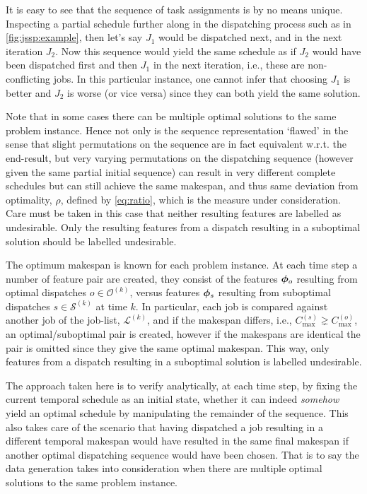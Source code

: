 \documentclass[smallextended]{svjour3}
\begin{document}
It is easy to see that the sequence of task assignments is by no means unique. 
Inspecting a partial schedule further along in the dispatching process such as 
in \cref{fig:jssp:example}, then let's say $J_1$ would be dispatched next, and 
in the next iteration $J_2$. Now this sequence would yield the same schedule as 
if $J_2$ would have been dispatched first and then $J_1$ in the next iteration, 
i.e., these are non-conflicting jobs.  In this particular instance, one cannot 
infer that choosing $J_1$ is better and $J_2$ is worse (or vice versa) since
they can both yield the same solution. 

Note that in some cases there can be multiple optimal solutions to the same 
problem instance. Hence not only is the sequence representation `flawed' in the 
sense that slight permutations on the sequence are in fact equivalent w.r.t. 
the end-result, but very varying permutations on the dispatching sequence 
(however given the same partial initial sequence) can result in very different 
complete schedules but can still achieve the same makespan, and thus same 
deviation from optimality, $\rho$, defined by \cref{eq:ratio}, which is the 
measure under consideration. Care must be taken in this case that neither 
resulting features are labelled as undesirable. Only the resulting features 
from a dispatch resulting in a suboptimal solution should be labelled 
undesirable.

The optimum makespan is known for each problem instance. At each time step a 
number of feature pair are created, they consist of the features $\bm{\phi}_o$ 
resulting from optimal dispatches $o\in\mathcal{O}^{(k)}$, versus features 
$\bm{\phi}_s$ resulting from suboptimal dispatches $s\in\mathcal{S}^{(k)}$ at time 
$k$. %
In particular, each job is compared against another job of the job-list, 
$\mathcal{L}^{(k)}$, and if the makespan differs, i.e., $C_{\max}^{(s)}\gneq 
C_{\max}^{(o)}$, an optimal/suboptimal pair is created, however if the 
makespans are identical the pair is omitted since they give the same optimal 
makespan. This way, only features from a dispatch resulting in a suboptimal 
solution is labelled undesirable.

The approach taken here is to verify analytically, at each time step, by fixing 
the current temporal schedule as an initial state, whether it can indeed 
\emph{somehow} yield an optimal schedule by manipulating the remainder of the 
sequence. This also takes care of the scenario that having dispatched a job 
resulting in a different temporal makespan would have resulted in the same 
final makespan if another optimal dispatching sequence would have been chosen. 
That is to say the data generation takes into consideration when there are 
multiple optimal solutions to the same problem instance. 
\end{document}
